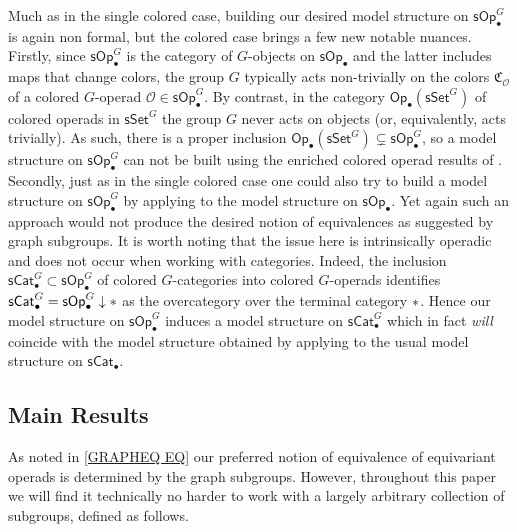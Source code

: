 \documentclass[a4paper,10pt
,draft
]{article}%
\numberwithin{equation}{section}
\numberwithin{figure}{section}
\theoremstyle{definition} %
\renewcommand{\O}{\ensuremath{\mathcal O}}
\newcommand{\1}{\ensuremath{\mathbbm 1}}%
\begin{document}
Much as in the single colored case,
building our desired model structure
on $\mathsf{sOp}^G_{\bullet}$
is again non formal,
but the colored case brings a few new notable nuances.
Firstly, since 
$\mathsf{sOp}_{\bullet}^G$
is the category of $G$-objects on 
$\mathsf{sOp}_{\bullet}$
and the latter
includes maps that change colors,
the group $G$ typically acts non-trivially
on the colors $\mathfrak{C}_{\mathcal{O}}$
of a colored $G$-operad
$\O \in \mathsf{sOp}_{\bullet}^G$.
By contrast, in the category
$\mathsf{Op}_{\bullet}(\mathsf{sSet}^G)$
of colored operads in $\mathsf{sSet}^G$
the group $G$ never acts on objects (or, equivalently, acts trivially).
As such, there is a proper inclusion
$\mathsf{Op}_{\bullet}(\mathsf{sSet}^G)
\subsetneq \mathsf{sOp}_{\bullet}^G$,
so a model structure on 
$\mathsf{sOp}_{\bullet}^G$
can not be built using the enriched colored operad results of \cite{Cav}.
Secondly, just as in the single colored case 
one could also try to build a model structure
on $\mathsf{sOp}^G_{\bullet}$
by applying 
\cite[Prop 2.6]{Ste16}
to the model structure on $\mathsf{sOp}_\bullet$.
Yet again such an approach would not produce
the desired notion of equivalences as suggested by graph subgroups.
%
It is worth noting that the issue here is intrinsically operadic
and does not occur when working with categories.
Indeed, the inclusion
$\mathsf{sCat}^G_{\bullet} \subset 
\mathsf{sOp}^G_{\bullet}$
of colored $G$-categories into 
colored $G$-operads identifies
$\mathsf{sCat}^G_{\bullet} = 
\mathsf{sOp}^G_{\bullet} \downarrow \**$
as the overcategory over the terminal category $\**$.
Hence our model structure on 
$\mathsf{sOp}^G_{\bullet}$
induces a model structure on 
$\mathsf{sCat}^G_{\bullet}$ which %
in fact \emph{will} 
coincide with the model structure obtained by applying
\cite[Prop. 2.6]{Ste16}
to the usual model structure on $\mathsf{sCat}_{\bullet}$.







\subsection{Main Results}


As noted in \eqref{GRAPHEQ EQ} our preferred notion of equivalence of equivariant operads is determined by the graph subgroups.
However, throughout this paper we will find it technically 
no harder to work with a largely arbitrary collection of subgroups,
defined as follows.
\end{document}

